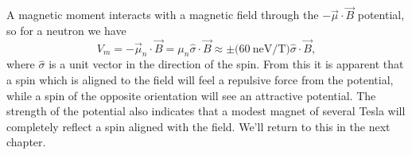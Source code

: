 A magnetic moment interacts with a magnetic field through the $-\vec{\mu} \cdot \vec{B}$ potential, so for
a neutron we have
%
\begin{equation}
  V_m = -\vec{\mu}_n \cdot \vec{B} = \mu_n \hat{\sigma} \cdot \vec{B} \approx \pm \big(60 \mathrm{~neV/T}\big)
  \hat{\sigma} \cdot \vec{B}, 
\end{equation}
where $\hat{\sigma}$ is a unit vector in the direction of the spin. From this it is apparent that a spin which is
aligned to the field will feel a repulsive force from the potential, while a spin of the opposite orientation
will see an attractive potential. The strength of the potential also indicates that a modest magnet of several
Tesla will completely reflect a spin aligned with the field. We'll return to this in the next chapter.








